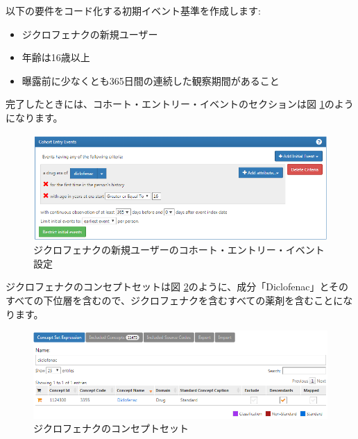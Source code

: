 \documentclass[
  11pt]{book}
\providecommand{\tightlist}{%
  \setlength{\itemsep}{0pt}\setlength{\parskip}{0pt}}
\theoremstyle{definition}
\theoremstyle{definition}
\theoremstyle{definition}
\theoremstyle{definition}
\theoremstyle{remark}
\begin{document}
以下の要件をコード化する初期イベント基準を作成します:

\begin{itemize}
\tightlist
\item
  ジクロフェナクの新規ユーザー
\item
  年齢は16歳以上
\item
  曝露前に少なくとも365日間の連続した観察期間があること
\end{itemize}

完了したときには、コホート・エントリー・イベントのセクションは図 \ref{fig:cohortsAtlasInitialEvents}のようになります。

\begin{figure}

{\centering \includegraphics[width=1\linewidth]{images/SuggestedAnswers/cohortsAtlasInitialEvents} 

}

\caption{ジクロフェナクの新規ユーザーのコホート・エントリー・イベント設定}\label{fig:cohortsAtlasInitialEvents}
\end{figure}

ジクロフェナクのコンセプトセットは図 \ref{fig:cohortsAtlasConceptSet1}のように、成分「Diclofenac」とそのすべての下位層を含むので、ジクロフェナクを含むすべての薬剤を含むことになります。

\begin{figure}

{\centering \includegraphics[width=1\linewidth]{images/SuggestedAnswers/cohortsAtlasConceptSet1} 

}

\caption{ジクロフェナクのコンセプトセット}\label{fig:cohortsAtlasConceptSet1}
\end{figure}
\end{document}
